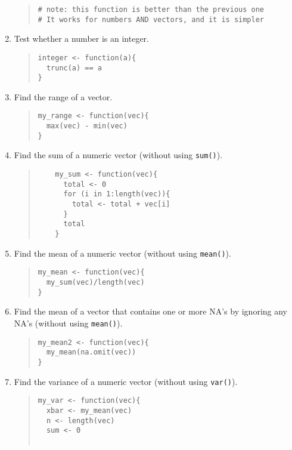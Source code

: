 \documentclass{article}
\begin{document}
\begin{enumerate}
\begin{quote}
\begin{verbatim}
# note: this function is better than the previous one
# It works for numbers AND vectors, and it is simpler
    \end{verbatim}
  \end{quote}

\item Test whether a number is an integer.
  \begin{quote}
    \begin{verbatim}
integer <- function(a){
  trunc(a) == a
}
    \end{verbatim}
  \end{quote}


\item Find the range of a vector.
  \begin{quote}
    \begin{verbatim}
my_range <- function(vec){
  max(vec) - min(vec)
}
    \end{verbatim}
  \end{quote}

\item Find the sum of a numeric vector (without using \verb!sum()!).
  \begin{quote}
     \begin{verbatim}
	my_sum <- function(vec){
	  total <- 0
	  for (i in 1:length(vec)){
	  	total <- total + vec[i]
	  }
	  total
	}
    \end{verbatim}
  \end{quote}

\item Find the mean of a numeric vector (without using \verb!mean()!).
  \begin{quote}
    \begin{verbatim}
my_mean <- function(vec){
  my_sum(vec)/length(vec)
}
    \end{verbatim}
  \end{quote}
  
\item Find the mean of a vector that contains one or more NA's by ignoring any NA's (without using \verb!mean()!).
  \begin{quote}
    \begin{verbatim}
my_mean2 <- function(vec){
  my_mean(na.omit(vec))
}

    \end{verbatim}
  \end{quote}

\item Find the variance of a numeric vector (without using \verb!var()!).
  \begin{quote}
    \begin{verbatim}
my_var <- function(vec){
  xbar <- my_mean(vec)
  n <- length(vec)
  sum <- 0
  

\end{verbatim}
\end{quote}
\end{enumerate}
\end{document}
